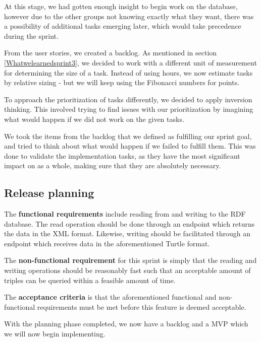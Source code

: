 At this stage, we had gotten enough insight to begin work on the database, however due to the other groups not knowing exactly what they want, there was a possibility of additional tasks emerging later, which would take precedence during the sprint.


From the user stories, we created a backlog. As mentioned in section \ref{Whatwelearnedsprint3}, we decided to work with a different unit of measurement for determining the size of a task.
Instead of using hours, we now estimate tasks by relative sizing - but we will keep using the Fibonacci numbers for points.

To approach the prioritization of tasks differently, we decided to apply inversion thinking\cite{InversionThinking}. This involved trying to find issues with our prioritization by imagining what would happen if we did not work on the given tasks. 

We took the items from the backlog that we defined as fulfilling our sprint goal, and tried to think about what would happen if we failed to fulfill them. 
This was done to validate the implementation tasks, as they have the most significant impact on \knox{} as a whole, making sure that they are absolutely necessary. 

\subsection*{Release planning}\label{acceptCriteriaSprint5}
The \textbf{functional requirements} include reading from and writing to the RDF database. 
The read operation should be done through an endpoint which returns the data in the XML format.
Likewise, writing should be facilitated through an endpoint which receives data in the aforementioned Turtle format.


The \textbf{non-functional requirement} for this sprint is simply that the reading and writing operations should be reasonably fast such that an acceptable amount of triples can be queried within a feasible amount of time.


The \textbf{acceptance criteria} is that the aforementioned functional and non-functional requirements must be met before this feature is deemed acceptable. 


With the planning phase completed, we now have a backlog and a MVP which we will now begin implementing.
